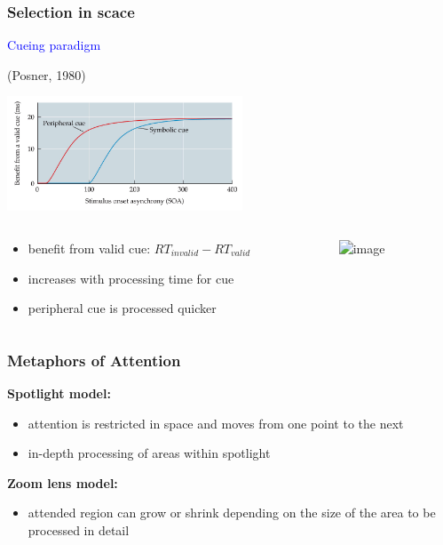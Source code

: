 \documentclass[]{beamer}
\begin{document}
\begin{frame}
\frametitle{Selection in scace}
\begin{overlayarea}{110mm}{80mm}
\begin{center}
\textcolor{blue}{Cueing paradigm} \begin{scriptsize}(Posner, 1980) \end{scriptsize}
\end{center}

 \begin{center}
\includegraphics[width=70mm]{figs/l8/cueing_results.png}
 \end{center}

\begin{columns}[T]
 \begin{column}{80mm}
 \begin{itemize}
 \item benefit from valid cue: $RT_{invalid} - RT_{valid}$
 \item increases with processing time for cue 
 \item peripheral cue is processed quicker
\end{itemize}
 \end{column}

 \begin{column}{40mm}
\includegraphics<2->[width=30mm]{figs/l8/symbolic_cue.png}  
 \end{column}
\end{columns}
\end{overlayarea}
\end{frame}



\begin{frame}
\frametitle{Metaphors of Attention}
\begin{overlayarea}{110mm}{75mm}
\textbf{Spotlight model:}

\begin{itemize}
 \setlength{\itemsep}{5pt}
 \item attention is restricted in space and moves from one point to the next
 \item in-depth processing of areas within spotlight
\end{itemize}

\textbf{Zoom lens model:}

\begin{itemize}
 \setlength{\itemsep}{5pt}
 \item attended region can grow or shrink depending on the size of the area to be processed in detail
\end{itemize}
\end{overlayarea}
\end{frame}
\end{document}
